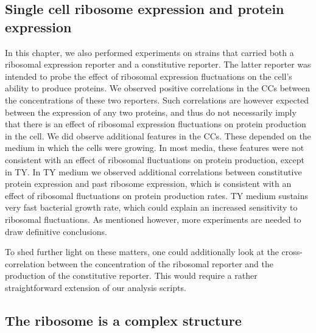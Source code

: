 \subsection{Single cell ribosome expression and protein expression}

In this chapter, we also performed experiments on strains that carried both a ribosomal expression reporter and a constitutive reporter.
The latter reporter was intended to probe the effect of ribosomal expression fluctuations on the cell's ability to produce proteins.
%
We observed positive correlations in the CCs between the concentrations of these two reporters. 
%
Such correlations are however 
%
expected between the expression of any two proteins, 
and thus do not necessarily imply that there is an effect of ribosomal expression fluctuations on protein production in the cell.
%
We did observe additional features in the CCs. 
These depended on the medium in which the cells were growing.
%
In most media, these features were not consistent with an effect of ribosomal fluctuations on protein production,
except in TY.
%
In TY medium we observed additional correlations between constitutive protein expression and past ribosome expression,
which is consistent with an effect of ribosomal fluctuations on protein production rates.
%
TY medium sustains very fast bacterial growth rate, 
which could explain an increased sensitivity to ribosomal fluctuations.
%
As mentioned however, more experiments are needed to draw definitive conclusions.


To shed further light on these matters, one could additionally look at the cross-correlation between
the concentration of the ribosomal reporter and the production of the constitutive reporter.
%
This would require a rather straightforward extension of our analysis scripts.


\subsection{The ribosome is a complex structure}


